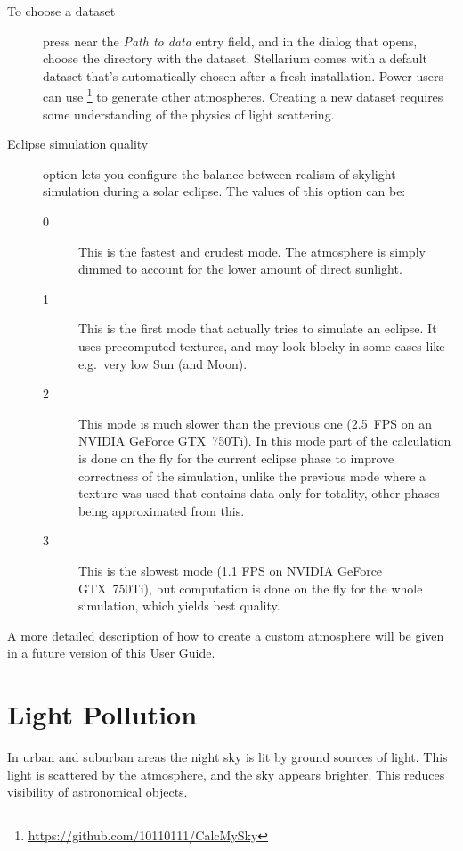 \begin{description}
\item[To choose a dataset] press 
  near the \emph{Path to data} entry field, and in the dialog that
  opens, choose the directory with the dataset.  Stellarium comes with
  a default dataset that's automatically chosen after a fresh
  installation.  Power users can use
  \footnote{\url{https://github.com/10110111/CalcMySky}}
  to generate other atmospheres. Creating a new dataset requires some
  understanding of the physics of light scattering.
\item[Eclipse simulation quality] option lets you configure the
  balance between realism of skylight simulation during a solar
  eclipse. The values of this option can be:
  \begin{description}
  \item[0] This is the fastest and crudest mode. The atmosphere is
    simply dimmed to account for the lower amount of direct sunlight.
  \item[1] This is the first mode that actually tries to simulate an
    eclipse. It uses precomputed textures, and may look blocky in some
    cases like e.g.\ very low Sun (and Moon).
  \item[2] This mode is much slower than the previous one (2.5~FPS on
    an NVIDIA GeForce GTX~750Ti).  In this mode part of the
    calculation is done on the fly for the current eclipse phase to
    improve correctness of the simulation, unlike the previous mode
    where a texture was used that contains data only for totality,
    other phases being approximated from this.
  \item[3] This is the slowest mode (1.1 FPS on NVIDIA GeForce
    GTX~750Ti), but computation is done on the fly for the whole
    simulation, which yields best quality.
  \end{description}
\end{description}

\noindent A more detailed description of how to create a custom atmosphere will
be given in a future version of this User Guide.


\section{Light Pollution}

In urban and suburban areas the night sky is lit by ground sources of light.
This light is scattered by the atmosphere, and the sky appears brighter. This
reduces visibility of astronomical objects.

